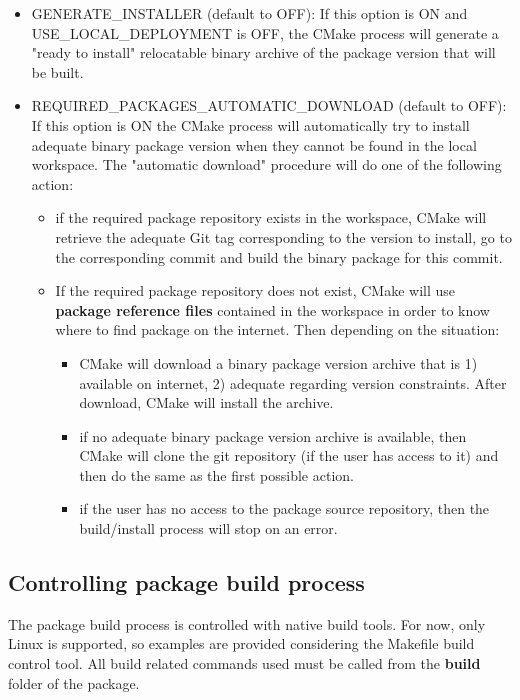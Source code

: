 \documentclass[12pt,a4paper]{article}
\begin{document}
\begin{itemize}
\item GENERATE\_INSTALLER (default to OFF): If this option is ON and USE\_LOCAL\_DEPLOYMENT is OFF, the CMake process will generate a "ready to install" relocatable binary archive of the package version that will be built. 
\item REQUIRED\_PACKAGES\_AUTOMATIC\_DOWNLOAD (default to OFF): If this option is ON the CMake process will automatically try to install adequate binary package version when they cannot be found in the local workspace. The "automatic download" procedure will do one of the following  action:
\begin{itemize}
\item if the required package repository exists in the workspace, CMake will retrieve the adequate Git tag corresponding to the version to install, go to the corresponding commit and build the binary package for this commit.
\item If the required package repository does not exist, CMake will use \textbf{package reference files} contained in the workspace in order to know where to find package on the internet. Then depending on the situation:
\begin{itemize}
\item CMake will download a binary package version archive that is 1) available on internet, 2) adequate regarding version constraints. After download, CMake will install the archive.
\item if no adequate binary package version archive is available, then CMake will clone the git repository (if the user has access to it) and then do the same as the first possible action.
\item if the user has no access to the package source repository, then the build/install process will stop on an error.
\end{itemize}
\end{itemize}
\end{itemize}


\subsection{Controlling package build process}
\label{sec:buildCMake}

The package build process is controlled with native build tools. For now, only Linux is supported, so examples are provided considering the Makefile build control tool. All build related commands used must be called from the \textbf{build} folder of the package.
\end{document}
